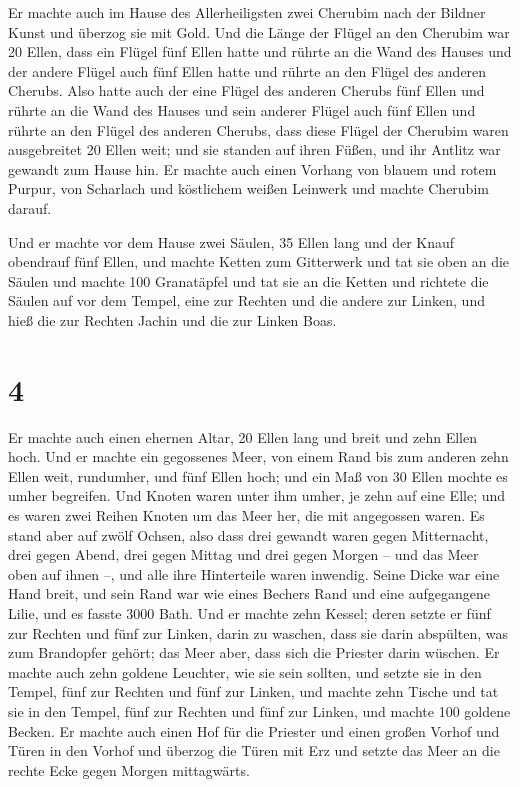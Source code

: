  Er machte auch im Hause des Allerheiligsten zwei
Cherubim nach der Bildner Kunst und überzog sie mit Gold.
 Und die Länge der Flügel an den Cherubim war 20 Ellen,
dass ein Flügel fünf Ellen hatte und rührte an die Wand des Hauses und
der andere Flügel auch fünf Ellen hatte und rührte an den Flügel des
anderen Cherubs.  Also hatte auch der eine Flügel des
anderen Cherubs fünf Ellen und rührte an die Wand des Hauses und sein
anderer Flügel auch fünf Ellen und rührte an den Flügel des anderen
Cherubs,  dass diese Flügel der Cherubim waren
ausgebreitet 20 Ellen weit; und sie standen auf ihren Füßen, und ihr
Antlitz war gewandt zum Hause hin.  Er machte auch einen
Vorhang von blauem und rotem Purpur, von Scharlach und köstlichem weißen
Leinwerk und machte Cherubim darauf.

 Und er machte vor dem Hause zwei Säulen, 35 Ellen lang
und der Knauf obendrauf fünf Ellen,  und machte Ketten
zum Gitterwerk und tat sie oben an die Säulen und machte 100 Granatäpfel
und tat sie an die Ketten  und richtete die Säulen auf
vor dem Tempel, eine zur Rechten und die andere zur Linken, und hieß die
zur Rechten Jachin und die zur Linken Boas.

\hypertarget{section-3}{%
\section{4}\label{section-3}}

 Er machte auch einen ehernen Altar, 20 Ellen lang und
breit und zehn Ellen hoch.  Und er machte ein gegossenes
Meer, von einem Rand bis zum anderen zehn Ellen weit, rundumher, und
fünf Ellen hoch; und ein Maß von 30 Ellen mochte es umher begreifen.
 Und Knoten waren unter ihm umher, je zehn auf eine Elle;
und es waren zwei Reihen Knoten um das Meer her, die mit angegossen
waren.  Es stand aber auf zwölf Ochsen, also dass drei
gewandt waren gegen Mitternacht, drei gegen Abend, drei gegen Mittag und
drei gegen Morgen -- und das Meer oben auf ihnen --, und alle ihre
Hinterteile waren inwendig.  Seine Dicke war eine Hand
breit, und sein Rand war wie eines Bechers Rand und eine aufgegangene
Lilie, und es fasste 3000 Bath.  Und er machte zehn
Kessel; deren setzte er fünf zur Rechten und fünf zur Linken, darin zu
waschen, dass sie darin abspülten, was zum Brandopfer gehört; das Meer
aber, dass sich die Priester darin wüschen.  Er machte
auch zehn goldene Leuchter, wie sie sein sollten, und setzte sie in den
Tempel, fünf zur Rechten und fünf zur Linken,  und machte
zehn Tische und tat sie in den Tempel, fünf zur Rechten und fünf zur
Linken, und machte 100 goldene Becken.  Er machte auch
einen Hof für die Priester und einen großen Vorhof und Türen in den
Vorhof und überzog die Türen mit Erz  und setzte das Meer
an die rechte Ecke gegen Morgen mittagwärts.

